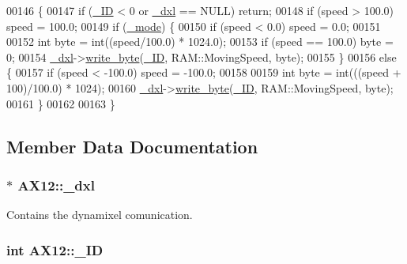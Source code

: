 \begin{DoxyCode}
00146 \{
00147     \textcolor{keywordflow}{if} (\hyperlink{a00001_a0ae2b35fee3d120075e1d8f1e2055804}{\_ID} < 0 or \hyperlink{a00001_a16df7ccc0a8d3c585a93b6916734bb17}{\_dxl} == NULL) \textcolor{keywordflow}{return};
00148     \textcolor{keywordflow}{if} (speed > 100.0) speed = 100.0;
00149     \textcolor{keywordflow}{if} (\hyperlink{a00001_a2fd07e2e636003227a32d09d211bd6d4}{\_mode}) \{
00150         \textcolor{keywordflow}{if} (speed < 0.0) speed = 0.0;
00151         
00152         \textcolor{keywordtype}{int} byte = int((speed/100.0) * 1024.0);
00153         \textcolor{keywordflow}{if} (speed == 100.0) byte = 0;
00154         \hyperlink{a00001_a16df7ccc0a8d3c585a93b6916734bb17}{\_dxl}->\hyperlink{a00003_a66c1e32cc45dd46d329f1fc212e46a3d}{write\_byte}(\hyperlink{a00001_a0ae2b35fee3d120075e1d8f1e2055804}{\_ID}, RAM::MovingSpeed, byte);        
00155     \}
00156     \textcolor{keywordflow}{else} \{
00157         \textcolor{keywordflow}{if} (speed < -100.0) speed = -100.0;   
00158         
00159         \textcolor{keywordtype}{int} byte = int(((speed + 100)/100.0) * 1024);
00160         \hyperlink{a00001_a16df7ccc0a8d3c585a93b6916734bb17}{\_dxl}->\hyperlink{a00003_a66c1e32cc45dd46d329f1fc212e46a3d}{write\_byte}(\hyperlink{a00001_a0ae2b35fee3d120075e1d8f1e2055804}{\_ID}, RAM::MovingSpeed, byte);
00161     \}
00162 
00163 \}
\end{DoxyCode}


\subsection{Member Data Documentation}
\hypertarget{a00001_a16df7ccc0a8d3c585a93b6916734bb17}{}
\subsubsection[{\+\_\+dxl}]{$\ast$ A\+X12\+::\+\_\+dxl\hspace{0.3cm}{\ttfamily [private]}}\label{a00001_a16df7ccc0a8d3c585a93b6916734bb17}


Contains the dynamixel comunication. 

\hypertarget{a00001_a0ae2b35fee3d120075e1d8f1e2055804}{}
\subsubsection[{\+\_\+\+I\+D}]{\setlength{\rightskip}{0pt plus 5cm}int A\+X12\+::\+\_\+\+I\+D\hspace{0.3cm}{\ttfamily [private]}}\label{a00001_a0ae2b35fee3d120075e1d8f1e2055804}


